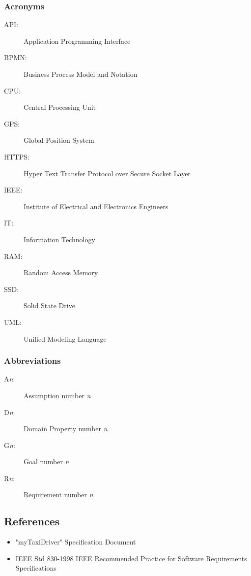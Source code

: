 \documentclass[a4paper]{article}
\begin{document}
\subsubsection{Acronyms}
\begin{description}
\item[API:] Application Programming Interface
\item[BPMN:] Business Process Model and Notation
\item[CPU:] Central Processing Unit
\item[GPS:] Global Position System
\item[HTTPS:] Hyper Text Transfer Protocol over Secure Socket Layer
\item[IEEE:] Institute of Electrical and Electronics Engineers
\item[IT:] Information Technology
\item[RAM:] Random Access Memory
\item[SSD:] Solid State Drive 
\item[UML:] Unified Modeling Language
\end{description}

\subsubsection{Abbreviations}
\begin{description}
\item[A\emph{n}:] Assumption number \emph{n}
\item[D\emph{n}:] Domain Property number \emph{n}
\item[G\emph{n}:] Goal number \emph{n}
\item[R\emph{n}:] Requirement number \emph{n}
\end{description}

\subsection{References}
\begin{itemize}
\item "myTaxiDriver" Specification Document
\item IEEE Std 830-1998 IEEE Recommended Practice for Software Requirements Specifications
\end{itemize}
\end{document}
